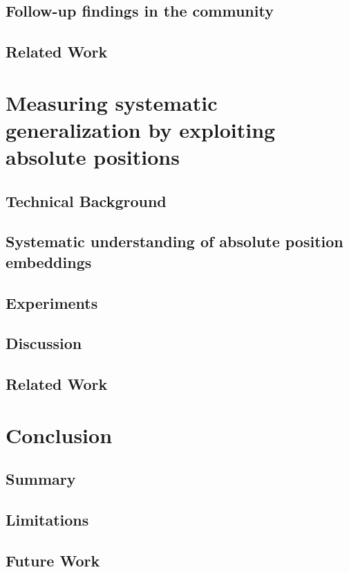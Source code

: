 \documentclass[letterpaper, 12pt]{report}
\begin{document}
\chapter{Follow-up findings in the community}
\label{sec:org0c2fffd}
\chapter{Related Work}
\label{sec:org279d5b6}
\clearpage
\part{Measuring systematic generalization by exploiting absolute positions}
\label{sec:orgf73b150}

\chapter{Technical Background}
\label{sec:org132da13}
\chapter{Systematic understanding of absolute position embeddings}
\label{sec:orgfd0d2b5}
\chapter{Experiments}
\label{sec:orgea347ef}
\chapter{Discussion}
\label{sec:org1bc127e}
\chapter{Related Work}
\label{sec:org75d823e}
\clearpage
\part{Conclusion}
\label{sec:orgcc9c607}
\chapter{Summary}
\label{sec:orgf62566a}
\chapter{Limitations}
\label{sec:org3bdc714}
\chapter{Future Work}
\label{sec:orga1d02ce}
\clearpage
\end{document}
